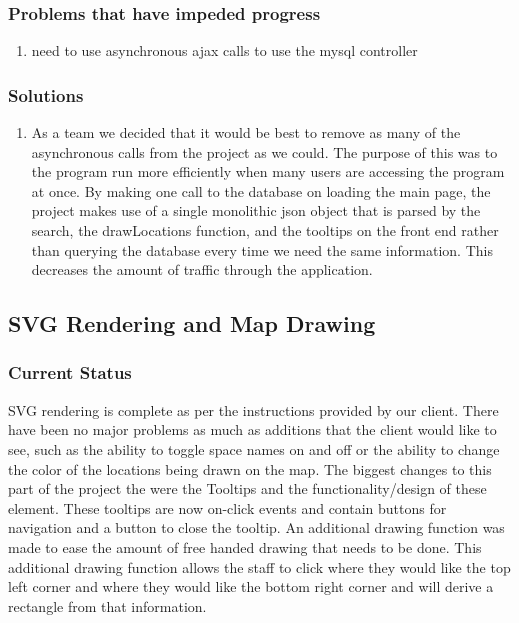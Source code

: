 \documentclass[letterpaper,10pt,serif,titlepage, onecolumn, compsoc]{IEEEtran}
\begin{document}
\subsubsection{Problems that have impeded progress}
\begin{enumerate}
\item need to use asynchronous ajax calls to use the mysql controller
\end{enumerate}


\subsubsection{Solutions}
\begin{enumerate}
\item As a team we decided that it would be best to remove as many of the asynchronous calls from the project as we could. The purpose of this was to the program run more efficiently when many users are accessing the program at once. By making one call to the database on loading the main page, the project makes use of a single monolithic json object that is parsed by the search, the drawLocations function, and the tooltips on the front end rather than querying the database every time we need the same information. This decreases the amount of traffic through the application.
\end{enumerate}

\subsection{SVG Rendering and Map Drawing }
\subsubsection{Current Status}
SVG rendering is complete as per the instructions provided by our client. There have been no major problems as much as additions that the client would like to see, such as the ability to toggle space names on and off or the ability to change the color of the locations being drawn on the map. The biggest changes to this part of the project the were the Tooltips and the functionality/design of these element. These tooltips are now on-click events and contain buttons for navigation and a button to close the tooltip. An additional drawing function was made to ease the amount of free handed drawing that needs to be done. This additional drawing function allows the staff to click where they would like the top left corner and where they would like the bottom right corner and will derive a rectangle from that information.
\end{document}
